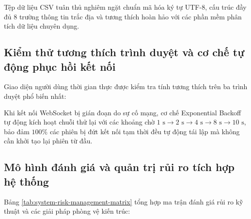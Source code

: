 Tệp dữ liệu CSV tuân thủ nghiêm ngặt chuẩn mã hóa ký tự UTF-8, cấu trúc đầy đủ 8 trường thông tin trắc địa và tương thích hoàn hảo với các phần mềm phân tích dữ liệu chuyên dụng.

\subsection{Kiểm thử tương thích trình duyệt và cơ chế tự động phục hồi kết nối}

\hspace{0.5cm} Giao diện người dùng thời gian thực được kiểm tra tính tương thích trên ba trình duyệt phổ biến nhất:

\begin{table}[H]
\centering
\caption{Ma trận kiểm thử tương thích đa nền tảng trình duyệt web}
\label{tab:browser-compatibility-matrix}
\end{table}

Khi kết nối WebSocket bị gián đoạn do sự cố mạng, cơ chế Exponential Backoff tự động kích hoạt chuỗi thử lại với các khoảng chờ $1\text{ s} \to 2\text{ s} \to 4\text{ s} \to 8\text{ s} \to 10\text{ s}$, bảo đảm $100\%$ các phiên bị đứt kết nối tạm thời đều tự động tái lập mà không cần khởi tạo lại phiên từ đầu.

\subsection{Mô hình đánh giá và quản trị rủi ro tích hợp hệ thống}

\hspace{0.5cm} Bảng \ref{tab:system-risk-management-matrix} tổng hợp ma trận đánh giá rủi ro kỹ thuật và các giải pháp phòng vệ kiến trúc:


